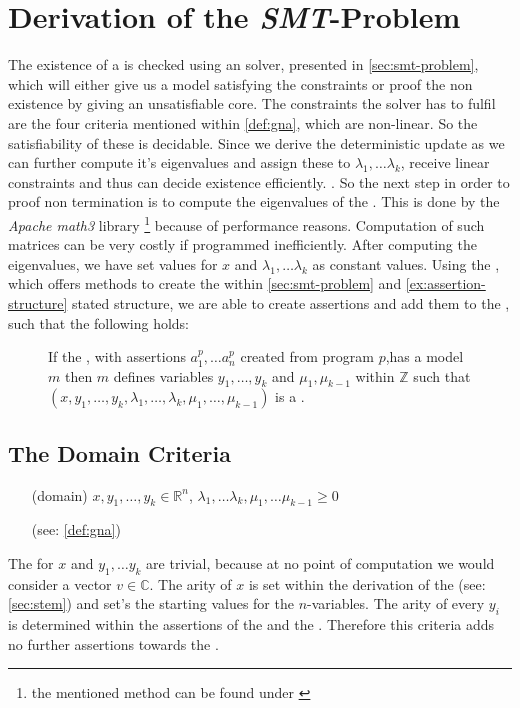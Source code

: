 \section{Derivation of the \emph{SMT}-Problem}
The existence of a \gna is checked using an  solver, presented in \autoref{sec:smt-problem}, which will either give us a model satisfying the constraints or proof the non existence by giving an unsatisfiable core. \newline
The constraints the  solver has to fulfil are the four criteria mentioned within \autoref{def:gna}, which are non-linear. So the satisfiability of these is decidable. Since we derive the deterministic update as \updatematrix we can further compute it's eigenvalues and assign these to $\lambda_1, \dots \lambda_k$, receive linear constraints and thus can decide existence efficiently. \cite{leike2014geometric}.%
\newline
So the next step in order to proof non termination is to compute the eigenvalues of the \updatematrix. This is done by the \textit{Apache math3} library \footnote{the mentioned method can be found under \cite{ApacheMath3}}  because of performance reasons. Computation of such matrices can be very costly if programmed inefficiently. %
After computing the eigenvalues, we have set values for $x$ and $\lambda_1, \dots \lambda_k$ as constant values.
\newline
Using the \smtfactory, which offers methods to create the within \autoref{sec:smt-problem} and \autoref{ex:assertion-structure} stated structure, we are able to create assertions and add them to the \solver, such that the following holds:
\begin{figure}[H]
	\centering
	If the \solver, with assertions $a^p_1, \dots a^p_n$ created from program $p$,has a model $m$ \newline
	then $m$ defines variables $y_1, \dots, y_k$ and $\mu_1, \mu_{k-1}$ within $\mathbb{Z}$ such that \newline
	$(x, y_1, \dots, y_k, \lambda_1, \dots, \lambda_k, \mu_1, \dots, \mu_{k-1})$ is a \gna.
\end{figure}

\subsection{The Domain Criteria}
\begin{itemize}
	\setlength{\itemindent}{1in}
	\item[(domain)] $x, y_1, \dots, y_k \in \mathbb{R}^n$, $\lambda_1, \dots \lambda_k, \mu_1, \dots \mu_{k-1} \ge 0$
	\item[] (see: \autoref{def:gna})
\end{itemize}
The \domc for $x$ and $y_1, \dots y_k$ are trivial, because at no point of computation we would consider a vector $v\in\mathbb{C}$.
The arity of $x$ is set within the derivation of the \stem (see: \autoref{sec:stem}) and set's the starting values for the $n$-variables. The arity of every $y_i$ is determined within the assertions of the \pointc and the \rayc.\newline
Therefore this criteria adds no further assertions towards the \solver.
